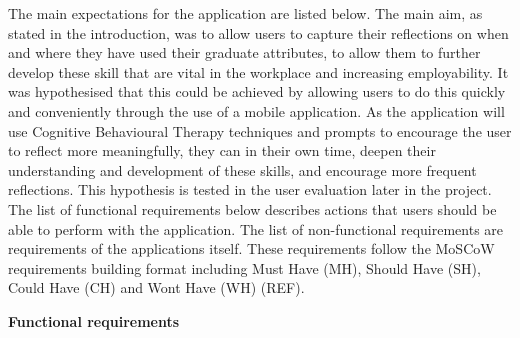 \documentclass{l4proj}
\begin{document}
The main expectations for the application are listed below. The main aim, as stated in the introduction, was to allow users to capture 
their reflections on when and where they have used their graduate attributes, to allow them to further develop these skill that 
are vital in the workplace and increasing employability. It was hypothesised that this could be achieved by allowing users to do this
quickly and conveniently through the use of a mobile application. As the application will use Cognitive Behavioural Therapy 
techniques and prompts to encourage the user to reflect more meaningfully, they can in their own time, deepen their understanding  and
development of these skills, and encourage more frequent reflections. This hypothesis is tested in the user evaluation later in the 
project. The list of functional requirements below describes actions that users should be able to perform with the application. 
The list of non-functional requirements are requirements of the applications itself.
These requirements follow the MoSCoW requirements building format including Must Have (MH), Should Have (SH), Could Have (CH) and Wont
Have (WH) (REF).
\par 
\textbf{Functional requirements}
\end{document}
